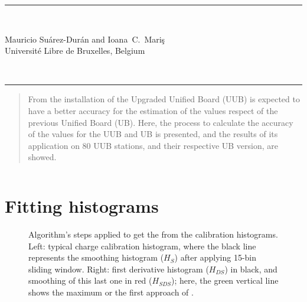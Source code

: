 \documentclass[twoside, final, 10pt]{articleMine}
\begin{document}
\setpagewiselinenumbers
\modulolinenumbers[2]

\linenumbers

\renewcommand\linenumberfont{\small\rmfamily}
\begin{flushright}
\end{flushright}

\begin{flushright}
  \rule{\linewidth}{0.5mm}
  \\[17mm]
  \large
  \parbox[b]{15cm}
  {
    \begin{flushright}
      Mauricio Su\'arez-Dur\'an and  Ioana~C.~Mari\c{s}
      \\[6mm]
      {\small Universit{\'e} Libre de Bruxelles, Belgium}
    \end{flushright}
  }
  \\[5mm]
  \rule{\linewidth}{0.5mm}
\end{flushright}
%
%
\thispagestyle{empty}
\noindent

\begin{abstract}
  \noindent
  From the installation of the Upgraded Unified Board (UUB) is
  expected to have a better accuracy for the estimation of the
  \qpkvem values respect of the previous Unified Board (UB).
  Here, the process to calculate the accuracy of the \qpkvem
  values for the UUB and UB is presented, and the results of its
  application on $80$ UUB stations, and their respective UB
  version, are showed.
\end{abstract}

%
%
\thispagestyle{empty}
$\;$
\noindent
\clearpage

\section{Fitting histograms}
\label{secFitting}

\begin{figure}[!t]
  \centering
  \caption{Algorithm's steps applied to get the \qpkvem from the
  calibration histograms. Left: typical charge calibration
  histogram, where the black line represents the smoothing
  histogram ($H_S$) after applying 15-bin sliding window. Right:
  first derivative histogram ($H_{DS}$) in black, and smoothing
  of this last one in red ($H_{SDS}$); here, the green vertical
  line shows the maximum or the first approach of \qpkvem.}
  \label{figChargeDerivative}
\end{figure}
\end{document}
